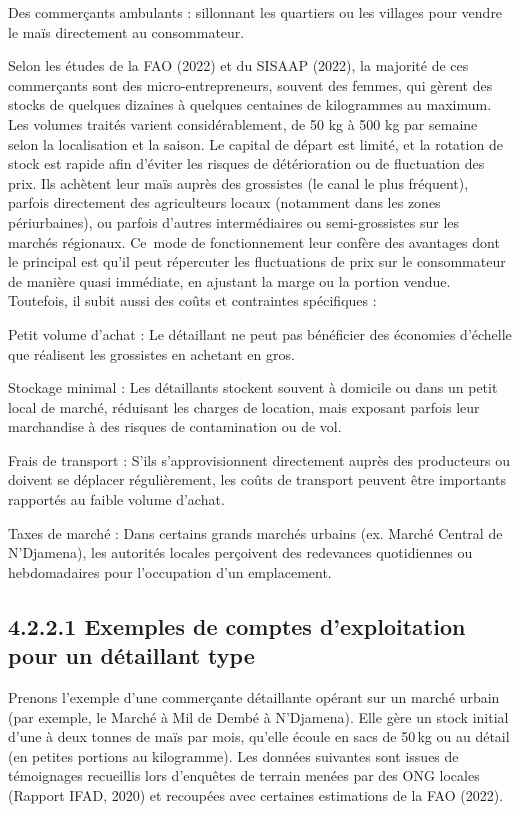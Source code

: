 \documentclass[12pt,oneside]{report}
\begin{document}
Des commerçants ambulants : sillonnant les quartiers ou les villages pour vendre le maïs directement au consommateur.

Selon les études de la FAO (2022) et du SISAAP (2022), la majorité de ces commerçants sont des micro-entrepreneurs, souvent des femmes, qui gèrent des stocks de quelques dizaines à quelques centaines de kilogrammes au maximum. Les volumes traités varient considérablement, de 50 kg à 500 kg par semaine selon la localisation et la saison. Le capital de départ est limité, et la rotation de stock est rapide afin d’éviter les risques de détérioration ou de fluctuation des prix. Ils achètent leur maïs auprès des grossistes (le canal le plus fréquent), parfois directement des agriculteurs locaux (notamment dans les zones périurbaines), ou parfois d’autres intermédiaires ou semi-grossistes sur les marchés régionaux. Ce mode de fonctionnement leur confère des avantages dont le principal est qu’il peut répercuter les fluctuations de prix sur le consommateur de manière quasi immédiate, en ajustant la marge ou la portion vendue. Toutefois, il subit aussi des coûts et contraintes spécifiques :

Petit volume d’achat : Le détaillant ne peut pas bénéficier des économies d’échelle que réalisent les grossistes en achetant en gros.

Stockage minimal : Les détaillants stockent souvent à domicile ou dans un petit local de marché, réduisant les charges de location, mais exposant parfois leur marchandise à des risques de contamination ou de vol.

Frais de transport : S’ils s’approvisionnent directement auprès des producteurs ou doivent se déplacer régulièrement, les coûts de transport peuvent être importants rapportés au faible volume d’achat.

Taxes de marché : Dans certains grands marchés urbains (ex. Marché Central de N’Djamena), les autorités locales perçoivent des redevances quotidiennes ou hebdomadaires pour l’occupation d’un emplacement.

\subsection{4.2.2.1 Exemples de comptes d’exploitation pour un détaillant type}
Prenons l’exemple d’une commerçante détaillante opérant sur un marché urbain (par exemple, le Marché à Mil de Dembé à N’Djamena). Elle gère un stock initial d’une à deux tonnes de maïs par mois, qu’elle écoule en sacs de 50 kg ou au détail (en petites portions au kilogramme). Les données suivantes sont issues de témoignages recueillis lors d’enquêtes de terrain menées par des ONG locales (Rapport IFAD, 2020) et recoupées avec certaines estimations de la FAO (2022).
\end{document}
